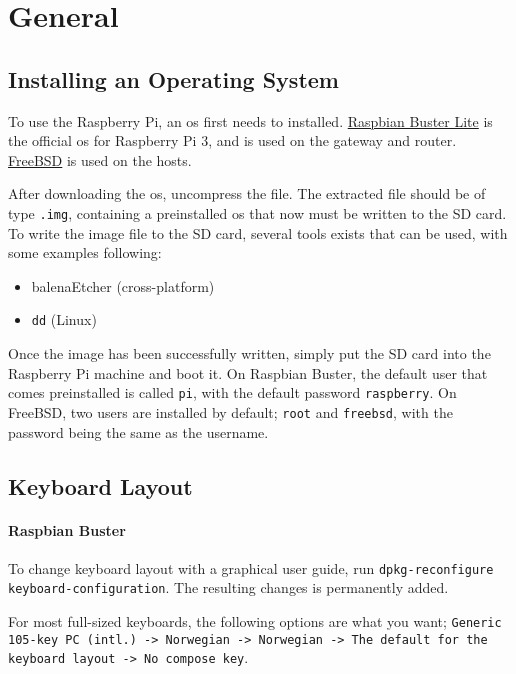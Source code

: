 \chapter{General}

\section{Installing an Operating System} \label{install_os}

To use the Raspberry Pi, an \gls{os} first needs to installed. \href{https://www.raspberrypi.org/downloads/raspbian/}{Raspbian Buster Lite} is the official \gls{os} for Raspberry Pi 3, and is used on the gateway and router. \href{https://www.freebsd.org/}{FreeBSD} is used on the hosts.

After downloading the \gls{os}, uncompress the file. The extracted file should be of type \lstinline{.img}, containing a preinstalled \gls{os} that now must be written to the SD card. To write the image file to the SD card, several tools exists that can be used, with some examples following:

\begin{itemize}
    \item balenaEtcher (cross-platform)
    \item \lstinline{dd} (Linux)
\end{itemize}

Once the image has been successfully written, simply put the SD card into the Raspberry Pi machine and boot it. On Raspbian Buster, the default user that comes preinstalled is called \lstinline{pi}, with the default password \lstinline{raspberry}. On FreeBSD, two users are installed by default; \lstinline{root} and \lstinline{freebsd}, with the password being the same as the username.


\section{Keyboard Layout} \label{keyboard_layout}

\subsubsection{Raspbian Buster}

To change keyboard layout with a graphical user guide, run \lstinline{dpkg-reconfigure keyboard-configuration}. The resulting changes is permanently added.

For most full-sized keyboards, the following options are what you want; \lstinline{Generic 105-key PC (intl.) -> Norwegian -> Norwegian -> The default for the keyboard layout -> No compose key}.

